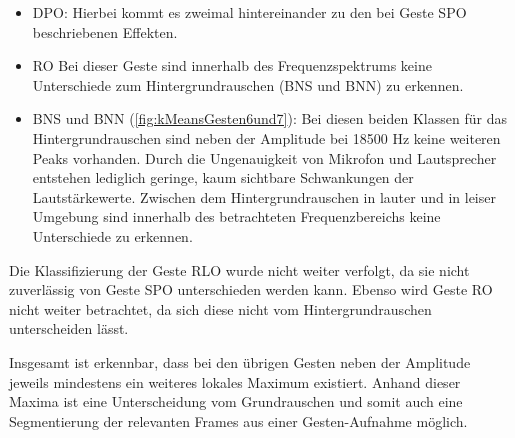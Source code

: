 \begin{itemize}
\item \ac{DPO}: Hierbei kommt es zweimal hintereinander zu den bei Geste \ac{SPO} beschriebenen Effekten.

\item \ac{RO} Bei dieser Geste sind innerhalb des Frequenzspektrums keine Unterschiede zum Hintergrundrauschen (\ac{BNS} und \ac{BNN}) zu erkennen.

\item \ac{BNS} und \ac{BNN} (\autoref{fig:kMeansGesten6und7}): Bei diesen beiden Klassen für das Hintergrundrauschen sind neben der Amplitude bei 18500 Hz keine weiteren Peaks vorhanden. Durch die Ungenauigkeit von Mikrofon und Lautsprecher entstehen lediglich geringe, kaum sichtbare Schwankungen der Lautstärkewerte. Zwischen dem Hintergrundrauschen in lauter und in leiser Umgebung sind innerhalb des betrachteten Frequenzbereichs keine Unterschiede zu erkennen.

\end{itemize}

Die Klassifizierung der Geste \ac{RLO} wurde nicht weiter verfolgt, da sie nicht zuverlässig von Geste \ac{SPO} unterschieden werden kann. Ebenso wird Geste \ac{RO} nicht weiter betrachtet, da sich diese nicht vom Hintergrundrauschen unterscheiden lässt.

Insgesamt ist erkennbar, dass bei den übrigen Gesten neben der Amplitude jeweils mindestens ein weiteres lokales Maximum existiert. Anhand dieser Maxima ist eine Unterscheidung vom Grundrauschen und somit auch eine Segmentierung der relevanten Frames aus einer Gesten-Aufnahme möglich.


